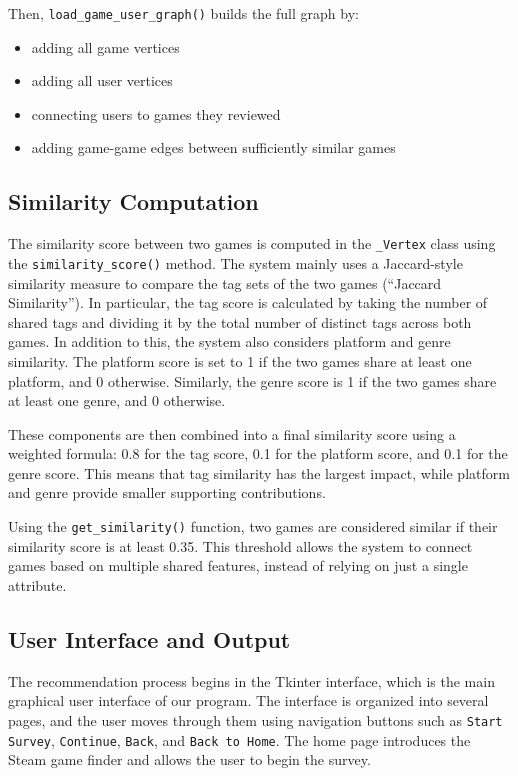 \documentclass[fontsize=11pt]{article}
\begin{document}
Then, \texttt{load\_game\_user\_graph()} builds the full graph by:
\begin{itemize}
    \item adding all game vertices
    \item adding all user vertices
    \item connecting users to games they reviewed
    \item adding game-game edges between sufficiently similar games
\end{itemize}

\subsection{Similarity Computation}

The similarity score between two games is computed in the \texttt{\_Vertex} class using the \texttt{similarity\_score()} method. The system mainly uses a Jaccard-style similarity measure to compare the tag sets of the two games (``Jaccard Similarity''). In particular, the tag score is calculated by taking the number of shared tags and dividing it by the total number of distinct tags across both games. In addition to this, the system also considers platform and genre similarity. The platform score is set to 1 if the two games share at least one platform, and 0 otherwise. Similarly, the genre score is 1 if the two games share at least one genre, and 0 otherwise.


These components are then combined into a final similarity score using a weighted formula: 0.8 for the tag score, 0.1 for the platform score, and 0.1 for the genre score. This means that tag similarity has the largest impact, while platform and genre provide smaller supporting contributions.

Using the \texttt{get\_similarity()} function, two games are considered similar if their similarity score is at least 0.35. This threshold allows the system to connect games based on multiple shared features, instead of relying on just a single attribute.

\newpage

\subsection{User Interface and Output}

The recommendation process begins in the Tkinter interface, which is the main graphical user interface of our program. The interface is organized into several pages, and the user moves through them using navigation buttons such as \texttt{Start Survey}, \texttt{Continue}, \texttt{Back}, and \texttt{Back to Home}. The home page introduces the Steam game finder and allows the user to begin the survey.
\end{document}
